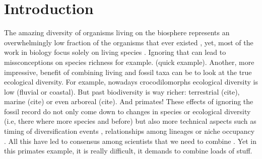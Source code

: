 \chapter{Introduction}
\label{chap:introduction}



%
% 

The amazing diversity of organisms living on the biosphere represents an overwhelmingly low fraction of the organisms that ever existed \citep{novacek1992ext,raup1993extinction}, yet, most of the work in biology focus solely on living species \citep{fritzdiversity2013,benton2015}.
Ignoring that can lead to missconceptions on species richness for example.
(quick example).
Another, more impressive, benefit of combining living and fossil taxa can be to look at the true ecological diversity.
For example, nowadays crocodilomorphs ecological diversity is low (fluvial or coastal).
But past biodiversity is way richer: terrestrial (cite), marine (cite) or even arboreal (cite).
And primates!
These effects of ignoring the fossil record do not only come down to changes in species or ecological diversity (i.e, there where more species and before) but also more technical aspects such as timing of diversification events \citep[e.g.][]{pyrondivergence2011}, relationships among lineages \citep[e.g.][]{manosphylogeny2007} or niche occupancy \citep[e.g.][]{pearmanniche2008}. %
All this have led to consensus among scientists that we need to combine \citep{jacksonwhat2006,quentaldiversity2010,dietlconservation2011,slaterunifying2013,fritzdiversity2013,benton2015}.
Yet in this primates example, it is really difficult, it demands to combine loads of stuff.

